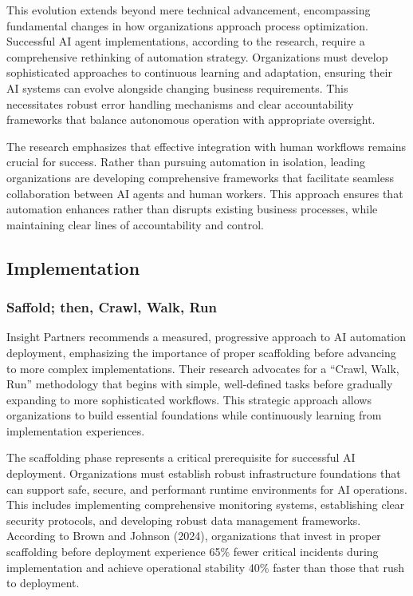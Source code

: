 \documentclass[
]{article}
\begin{document}
This evolution extends beyond mere technical advancement, encompassing
fundamental changes in how organizations approach process optimization.
Successful AI agent implementations, according to the research, require
a comprehensive rethinking of automation strategy. Organizations must
develop sophisticated approaches to continuous learning and adaptation,
ensuring their AI systems can evolve alongside changing business
requirements. This necessitates robust error handling mechanisms and
clear accountability frameworks that balance autonomous operation with
appropriate oversight.

The research emphasizes that effective integration with human workflows
remains crucial for success. Rather than pursuing automation in
isolation, leading organizations are developing comprehensive frameworks
that facilitate seamless collaboration between AI agents and human
workers. This approach ensures that automation enhances rather than
disrupts existing business processes, while maintaining clear lines of
accountability and control.

\subsection{Implementation}\label{implementation}

\subsubsection{Saffold; then, Crawl, Walk,
Run}\label{saffold-then-crawl-walk-run}

Insight Partners recommends a measured, progressive approach to AI
automation deployment, emphasizing the importance of proper scaffolding
before advancing to more complex implementations. Their research
advocates for a ``Crawl, Walk, Run'' methodology that begins with
simple, well-defined tasks before gradually expanding to more
sophisticated workflows. This strategic approach allows organizations to
build essential foundations while continuously learning from
implementation experiences.

The scaffolding phase represents a critical prerequisite for successful
AI deployment. Organizations must establish robust infrastructure
foundations that can support safe, secure, and performant runtime
environments for AI operations. This includes implementing comprehensive
monitoring systems, establishing clear security protocols, and
developing robust data management frameworks. According to Brown and
Johnson (2024), organizations that invest in proper scaffolding before
deployment experience 65\% fewer critical incidents during
implementation and achieve operational stability 40\% faster than those
that rush to deployment.
\end{document}
